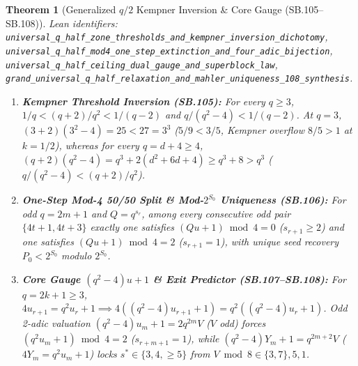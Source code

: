 \documentclass[11pt]{article}
\newtheorem{theorem}{Theorem}[section]
\begin{document}
\begin{theorem}[Generalized $q/2$ Kempner Inversion \& Core Gauge (SB.105--SB.108)]
\emph{Lean identifiers:} \nolinkurl{universal_q_half_zone_thresholds_and_kempner_inversion_dichotomy}, \nolinkurl{universal_q_half_mod4_one_step_extinction_and_four_adic_bijection}, \nolinkurl{universal_q_half_ceiling_dual_gauge_and_superblock_law}, \nolinkurl{grand_universal_q_half_relaxation_and_mahler_uniqueness_108_synthesis}.
\begin{enumerate}
  \item \textbf{Kempner Threshold Inversion (SB.105):} For every $q \ge 3$, $1/q < (q+2)/q^2 < 1/(q-2)$ and $q/(q^2-4) < 1/(q-2)$. At $q = 3$, $(3+2)(3^2-4) = 25 < 27 = 3^3$ ($5/9 < 3/5$, Kempner overflow $8/5 > 1$ at $k = 1/2$), whereas for every $q = d + 4 \ge 4$, $(q+2)(q^2-4) = q^3 + 2(d^2 + 6 d + 4) \ge q^3 + 8 > q^3$ ($q/(q^2-4) < (q+2)/q^2$).
  \item \textbf{One-Step Mod-4 50/50 Split \& Mod-$2^{S_0}$ Uniqueness (SB.106):} For odd $q = 2m+1$ and $Q = q^{s_r}$, among every consecutive odd pair $\{4t+1, 4t+3\}$ exactly one satisfies $(Q u + 1) \bmod 4 = 0$ ($s_{r+1} \ge 2$) and one satisfies $(Q u + 1) \bmod 4 = 2$ ($s_{r+1} = 1$), with unique seed recovery $P_0 < 2^{S_0}$ modulo $2^{S_0}$.
  \item \textbf{Core Gauge $(q^2 - 4) u + 1$ \& Exit Predictor (SB.107--SB.108):} For $q = 2k+1 \ge 3$, $4 u_{r+1} = q^2 u_r + 1 \implies 4((q^2-4)u_{r+1}+1) = q^2((q^2-4)u_r+1)$. Odd 2-adic valuation $(q^2-4)u_m + 1 = 2 q^{2m} V$ ($V$ odd) forces $(q^2 u_m + 1) \bmod 4 = 2$ ($s_{r+m+1} = 1$), while $(q^2-4) Y_m + 1 = q^{2m+2} V$ ($4 Y_m = q^2 u_m + 1$) locks $s^* \in \{3, 4, \ge 5\}$ from $V \bmod 8 \in \{3, 7\}, 5, 1$.
\end{enumerate}
\end{theorem}
\end{document}
